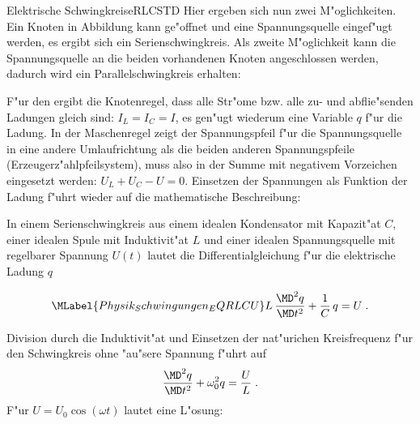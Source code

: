\begin{MXContent}{Elektrische Schwingkreise}{RLC}{STD}
Hier ergeben sich nun zwei M"oglichkeiten. Ein Knoten in Abbildung  kann ge"offnet und eine Spannungsquelle eingef"ugt werden, es ergibt sich ein Serienschwingkreis. Als zweite M"oglichkeit kann die Spannungsquelle an die beiden vorhandenen Knoten angeschlossen werden, dadurch wird ein Parallelschwingkreis erhalten:
\begin{center}
\end{center}

F"ur den  ergibt die Knotenregel, dass alle Str"ome bzw. alle zu- und abflie"senden Ladungen gleich sind: $I_L=I_C=I$, es gen"ugt wiederum eine Variable $q$ f"ur die Ladung. In der Maschenregel zeigt der Spannungspfeil f"ur die Spannungsquelle in eine andere Umlaufrichtung als die beiden anderen Spannungspfeile (Erzeugerz"ahlpfeilsystem), muss also in der Summe mit negativem Vorzeichen eingesetzt werden: $U_L+U_C-U=0$. Einsetzen der Spannungen als Funktion der Ladung f"uhrt wieder auf die mathematische Beschreibung:

\begin{MInfo}
In einem Serienschwingkreis aus einem idealen Kondensator mit Kapazit"at $C$, einer idealen Spule mit Induktivit"at $L$ und einer idealen Spannungsquelle mit regelbarer Spannung $U(t)$ lautet die Differentialgleichung f"ur die elektrische Ladung $q$

\begin{equation}\MLabel{Physik_Schwingungen_EQRLCU}
  L\, \frac{\MD^2 q }{\MD t^2} + \frac{1}{C}\, q = U \; .
\end{equation}

Division durch die Induktivit"at und Einsetzen der nat"urichen Kreisfrequenz f"ur den Schwingkreis ohne "au"sere Spannung f"uhrt auf 
\begin{equation}
  \frac{\MD^2 q }{\MD t^2} + \omega_0^2 q = \frac{U}{L} \; .
\end{equation}
F"ur $U=U_0\cos\left(\omega t\right)$ lautet eine L"osung:


\end{MInfo}
\end{MXContent}
